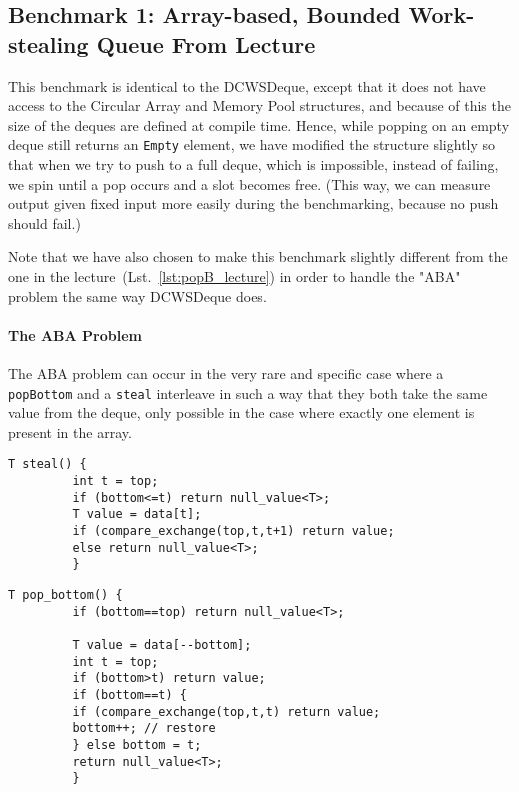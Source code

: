 \documentclass [10pt]{scrartcl}
\begin{document}
   \subsection{Benchmark 1: Array-based, Bounded Work-stealing Queue From Lecture}
   This benchmark is identical to the DCWSDeque, except that it does not have access to the Circular Array and Memory Pool structures, and because of this the size of the deques are defined at compile time. Hence, while popping on an empty deque still returns an \texttt{Empty} element, we have modified the structure slightly so that when we try to push to a full deque, which is impossible, instead of failing, we spin until a pop occurs and a slot becomes free. (This way, we can measure output given fixed input more easily during the benchmarking, because no push should fail.)
   
   Note that we have also chosen to make this benchmark slightly different from the one in the lecture~(Lst.~\ref{lst:popB_lecture}) in order to handle the "ABA" problem the same way DCWSDeque does.
   
   \paragraph{The ABA Problem}
   The ABA problem can occur in the very rare and specific case where a \texttt{popBottom} and a \texttt{steal} interleave in such a way that they both take the same value from the deque, only possible in the case where exactly one element is present in the array.
   
   \begin{center}
      \begin{minipage}[c]{\textwidth} %
         \begin{lstlisting}[caption={\texttt{pop\_top/steal} from the lecture\cite{PP}}, label={lst:popB_lecture}]
         T steal() {
         int t = top;
         if (bottom<=t) return null_value<T>;
         T value = data[t];
         if (compare_exchange(top,t,t+1) return value;
         else return null_value<T>;
         }
         \end{lstlisting}
      \end{minipage}
   \end{center}
   
   \begin{center}
      \begin{minipage}[c]{\textwidth} %
         \begin{lstlisting}[caption={\texttt{popBottom} from the lecture, which is vulnerable to the ABA problem\cite{PP}}, label={lst:popB_lecture}]
         T pop_bottom() {
         if (bottom==top) return null_value<T>;
         
         T value = data[--bottom];
         int t = top;
         if (bottom>t) return value;
         if (bottom==t) {
         if (compare_exchange(top,t,t) return value;
         bottom++; // restore
         } else bottom = t;
         return null_value<T>;
         }
         \end{lstlisting}
      \end{minipage}
   \end{center}
   
\end{document}
